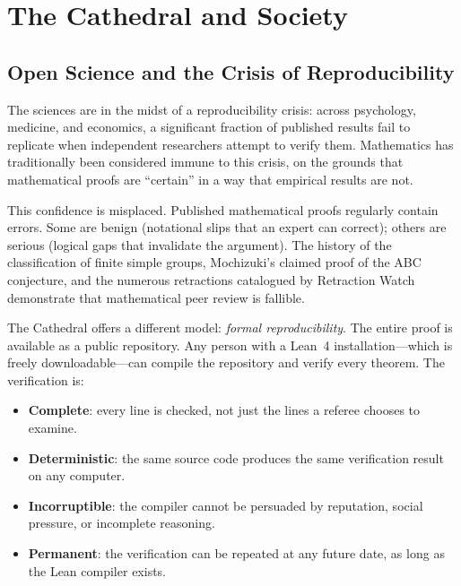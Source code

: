 \section{The Cathedral and Society}
\label{sec:society}

\subsection{Open Science and the Crisis of Reproducibility}

The sciences are in the midst of a reproducibility crisis: across
psychology, medicine, and economics, a significant fraction of
published results fail to replicate when independent researchers
attempt to verify them. Mathematics has traditionally been
considered immune to this crisis, on the grounds that mathematical
proofs are ``certain'' in a way that empirical results are not.

This confidence is misplaced. Published mathematical proofs
regularly contain errors. Some are benign (notational slips that
an expert can correct); others are serious (logical gaps that
invalidate the argument). The history of the classification of
finite simple groups, Mochizuki's claimed proof of the ABC
conjecture, and the numerous retractions catalogued by
Retraction Watch demonstrate that mathematical peer review is
fallible.

The Cathedral offers a different model: \emph{formal
reproducibility}. The entire proof is available as a public
repository. Any person with a Lean~4 installation---which is
freely downloadable---can compile the repository and verify
every theorem. The verification is:

\begin{itemize}
  \item \textbf{Complete}: every line is checked, not just the
    lines a referee chooses to examine.
  \item \textbf{Deterministic}: the same source code produces
    the same verification result on any computer.
  \item \textbf{Incorruptible}: the compiler cannot be persuaded
    by reputation, social pressure, or incomplete reasoning.
  \item \textbf{Permanent}: the verification can be repeated at
    any future date, as long as the Lean compiler exists.
\end{itemize}

